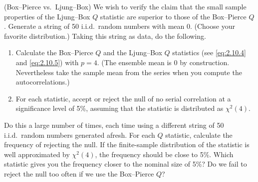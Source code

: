 \begin{problemset}
\exercise[2] (Box--Pierce vs.\ Ljung--Box)\quad
We wish to verify the claim that the small sample
properties of the Ljung--Box $Q$ statistic are superior to those of the Box--Pierce
$Q$. Generate a string of 50 i.i.d.\ random numbers with mean 0. (Choose your
favorite distribution.) Taking this string as data, do the following.

\begin{enumerate}
\item Calculate the Box--Pierce $Q$ and the Ljung--Box $Q$ statistics (see \eqref{eq:2.10.4}
and \eqref{eq:2.10.5}) with $p = 4$. (The ensemble mean is 0 by construction. Nevertheless take the sample mean from the series when you compute the autocorrelations.)

\item For each statistic, accept or reject the null of no serial correlation at a significance level of 5\%, assuming that the statistic is distributed as $\chi^2(4)$.
\end{enumerate}

\noindent
Do this a large number of times, each time using a different string of 50 i.i.d.\
random numbers generated afresh. For each $Q$ statistic, calculate the frequency
of rejecting the null. If the finite-sample distribution of the statistic is well
approximated by $\chi^2(4)$, the frequency should be close to 5\%. Which statistic
gives you the frequency closer to the nominal size of 5\%? Do we fail to reject
the null too often if we use the Box--Pierce $Q$?

\end{problemset}

